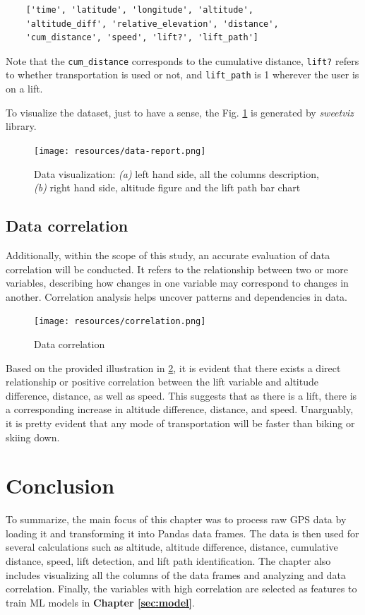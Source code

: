 \begin{verbatim}
    ['time', 'latitude', 'longitude', 'altitude',
    'altitude_diff', 'relative_elevation', 'distance',
    'cum_distance', 'speed', 'lift?', 'lift_path']
\end{verbatim}

Note that the \texttt{cum\_distance} corresponds to the cumulative distance, 
\texttt{lift?} refers to whether transportation is used or not, and 
\texttt{lift\_path} is 1 wherever the user is on a lift.

To visualize the dataset, just to have a sense, the Fig. \ref{fig:data-report} is generated by \textit{sweetviz} library. 


\begin{figure}[htb]
	\texttt{[image: resources/data-report.png]}
	\caption{Data visualization: \textit{(a)} left hand side, all the columns description, \textit{(b)} right hand side, altitude figure and the lift path bar chart}
	\label{fig:data-report}
\end{figure}

\subsection{Data correlation}
Additionally, within the scope of this study, an accurate evaluation of data correlation will be conducted. It refers to the relationship between two or more variables, describing how changes in one variable may correspond to changes in another. Correlation analysis helps uncover patterns and dependencies in data.



\begin{figure}[htb]
	\texttt{[image: resources/correlation.png]}
	\caption{Data correlation}
	\label{fig:correlation}
\end{figure}

Based on the provided illustration in  \ref{fig:correlation}, it is evident that there exists a direct relationship or positive correlation between the lift variable and altitude difference, distance, as well as speed. This suggests that as there is a lift, there is a corresponding increase in altitude difference, distance, and speed. Unarguably, it is pretty evident that any mode of transportation will be faster than biking or skiing down.

\section{Conclusion}
\label{sec:data:conclusion}

To summarize, the main focus of this chapter was to process raw GPS data by loading it and transforming it into Pandas data frames. The data is then used for several calculations such as altitude, altitude difference, distance, cumulative distance, speed, lift detection, and lift path identification. The chapter also includes visualizing all the columns of the data frames and analyzing and data correlation. Finally, the variables with high correlation are selected as features to train ML models in
\textbf{Chapter \ref{sec:model}}.

